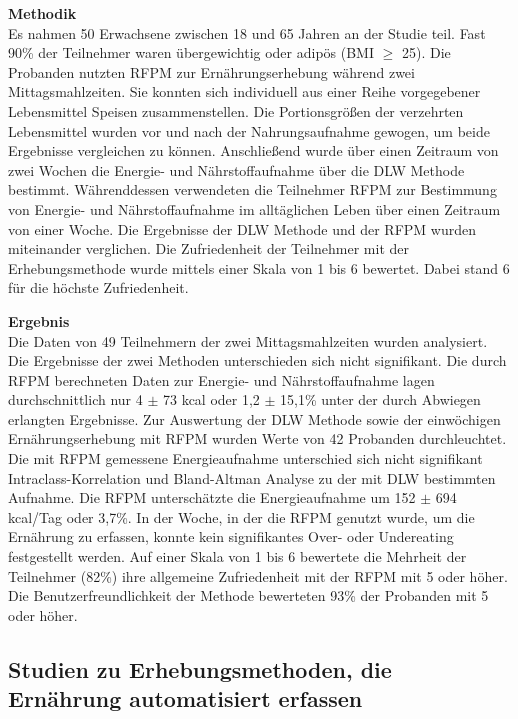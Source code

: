 \textbf{Methodik}\\
Es nahmen 50 Erwachsene zwischen 18 und 65 Jahren an der Studie teil. Fast 90\% der Teilnehmer waren übergewichtig oder adipös (BMI $\geq$ 25). Die Probanden nutzten RFPM zur Ernährungserhebung während zwei Mittagsmahlzeiten. Sie konnten sich individuell aus einer Reihe vorgegebener Lebensmittel Speisen zusammenstellen. Die Portionsgrößen der verzehrten Lebensmittel wurden vor und nach der Nahrungsaufnahme gewogen, um beide Ergebnisse vergleichen zu können. Anschließend wurde über einen Zeitraum von zwei Wochen die Energie- und Nährstoffaufnahme über die DLW Methode bestimmt. Währenddessen verwendeten die Teilnehmer RFPM zur Bestimmung von Energie- und Nährstoffaufnahme im alltäglichen Leben über einen Zeitraum von einer Woche. Die Ergebnisse der DLW Methode und der RFPM wurden miteinander verglichen. Die Zufriedenheit der Teilnehmer mit der Erhebungsmethode wurde mittels einer Skala von 1 bis 6 bewertet. Dabei stand 6 für die höchste Zufriedenheit.

\textbf{Ergebnis}\\
Die Daten von 49 Teilnehmern der zwei Mittagsmahlzeiten wurden analysiert. Die Ergebnisse der zwei Methoden unterschieden sich nicht signifikant. Die durch RFPM berechneten Daten zur Energie- und Nährstoffaufnahme lagen durchschnittlich nur 4 $\pm$ 73 kcal oder 1,2 $\pm$ 15,1\% unter der durch Abwiegen erlangten Ergebnisse. 
Zur Auswertung der DLW Methode sowie der einwöchigen Ernährungserhebung mit RFPM wurden Werte von 42 Probanden durchleuchtet. Die mit RFPM gemessene Energieaufnahme unterschied sich nicht signifikant   Intraclass-Korrelation und Bland-Altman Analyse zu der mit DLW bestimmten Aufnahme. Die RFPM unterschätzte die Energieaufnahme um 152 $\pm$ 694 kcal/Tag oder 3,7\%. 
In der Woche, in der die RFPM genutzt wurde, um die Ernährung zu erfassen, konnte kein signifikantes  Over- oder Undereating festgestellt werden. 
Auf einer Skala von 1 bis 6 bewertete die Mehrheit der Teilnehmer (82\%) ihre allgemeine Zufriedenheit mit der RFPM mit 5 oder höher. Die Benutzerfreundlichkeit der Methode bewerteten 93\% der Probanden mit 5 oder höher. 



\subsection{Studien zu Erhebungsmethoden, die Ernährung automatisiert erfassen}


